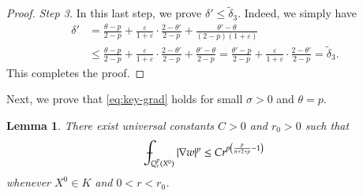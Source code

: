 \documentclass[11pt,oneside,english]{amsart}
\newcommand{\e}{\varepsilon}
\newcommand{\de}{\delta}
\newcommand{\D}{\nabla}
\numberwithin{equation}{section}
\def\Xint#1{\mathchoice
  {\XXint\displaystyle\textstyle{#1}}%
  {\XXint\textstyle\scriptstyle{#1}}%
  {\XXint\scriptstyle\scriptscriptstyle{#1}}%
  {\XXint\scriptscriptstyle\scriptscriptstyle{#1}}%
  \!\int}
\def\XXint#1#2#3{{\setbox0=\hbox{$#1{#2#3}{\int}$}
    \vcenter{\hbox{$#2#3$}}\kern-.5\wd0}}
\def\dashint{\Xint-}
\theoremstyle{plain}
\newtheorem{lemma}{Lemma}
\numberwithin{equation}{section}
\begin{document}
\begin{proof}
\medskip\noindent\emph{Step 3.} In this last step, we prove $\de'\le \tilde\de_3$. Indeed, we simply have
\begin{align*}
    \de'&=\frac{\theta-p}{2-p}+\frac{\e}{1+\e}\cdot\frac{2-\theta'}{2-p}+\frac{\theta'-\theta}{(2-p)(1+\e)}\\
    &\le\frac{\theta-p}{2-p}+\frac{\e}{1+\e}\cdot\frac{2-\theta'}{2-p}+\frac{\theta'-\theta}{2-p}=\frac{\theta'-p}{2-p}+\frac{\e}{1+\e}\cdot\frac{2-\theta'}{2-p}=\tilde\de_3.
\end{align*}
This completes the proof.   
\end{proof}

Next, we prove that \eqref{eq:key-grad} holds for small $\sigma>0$ and $\theta=p$.

\begin{lemma}
    \label{lem:par-u-est-initial}
    There exist universal constants $C>0$ and $r_0>0$ such that
    $$
    \dashint_{Q_r^p(X^0)}|\D w|^p\le Cr^{p\left(\frac{p}{n+2+p}-1 \right)}
    $$
    whenever $X^0\in K$ and $0<r< r_0$.
\end{lemma}
\end{document}
